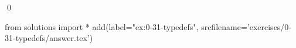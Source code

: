 
\begin{ex}
  \label{ex:0-31-typedefs}
  
  \qed
\end{ex}
\begin{python0}
from solutions import *
add(label="ex:0-31-typedefs",
    srcfilename='exercises/0-31-typedefs/answer.tex')
\end{python0}
